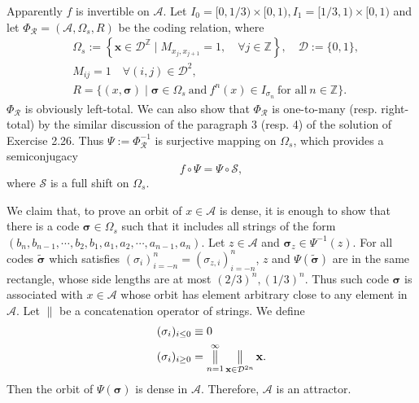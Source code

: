 \documentclass[a4paper,11pt,fleqn]{article}
\newcommand{\catop}{\mathop{\big \|}\limits}
\begin{document}
Apparently $f$ is invertible on $\mathcal{A}$. Let $I_0 = [0,1/3)\times [0,1), I_1 = [1/3,1)\times [0,1)$ and let $\Phi_{\mathcal R} =  (\mathcal{A},\Omega_s,R)$ be the coding relation, where
\begin{align}
&\Omega_s:=\left\{\mathbf{x} \in \mathcal{D}^{\mathbb{Z}} \mid M_{x_j, x_{j+1}}=1, \quad \forall j \in \mathbb{Z}\right\}, \quad \mathcal{D}:=\{0,1\}, \\
&M_{ij} = 1 \quad \forall (i,j) \in \mathcal{D}^2, \\
&R = \{(x,{\bm \sigma}) \mid {\bm \sigma} \in \Omega_s \ \text{and} \ f^n(x) \in I_{{\sigma}_n} \ \text{for all} \ n \in \mathbb{Z}\}.
\end{align}
$\Phi_{\mathcal R}$ is obviously left-total. We can also show that $\Phi_{\mathcal R}$ is one-to-many (resp. right-total) by the similar discussion of the paragraph 3 (resp. 4) of the solution of Exercise 2.26. Thus $\Psi:=\Phi_{\mathcal R}^{-1}$ is surjective mapping on $\Omega_s$, which provides a semiconjugacy  
\begin{equation}
    f\circ \Psi = \Psi\circ \mathcal{S}, 
\end{equation} 
where $\mathcal{S}$ is a full shift on $\Omega_s$. 

We claim that, to prove an orbit of $x \in \mathcal{A}$ is dense, it is enough to show that there is a code ${\bm \sigma} \in \Omega_s$ such that it includes all strings of the form $(b_n,b_{n-1},\cdots,b_2,b_1,a_1,a_2,\cdots,a_{n-1},a_n)$. Let $z\in\mathcal{A}$ and ${\bm \sigma}_z \in \Psi^{-1}(z)$. For all codes $\tilde{\bm \sigma}$ which satisfies $({\sigma_i})_{i=-n}^n = ({\sigma_{z,i}})_{i=-n}^n$, $z$ and $\Psi(\tilde{\bm \sigma})$ are in the same rectangle, whose side lengths are at most $(2/3)^n,(1/3)^n$. Thus such code ${\bm \sigma}$ is associated with $x \in \mathcal{A}$ whose orbit has element arbitrary close to any element in $\mathcal{A}$. 
Let $\|$ be a concatenation operator of strings. We define 
\begin{align}
    &(\sigma_i)_{i\le 0} \equiv 0 \\
    &(\sigma_i)_{i\ge 0} = \catop_{n=1}^\infty\catop_{{\bf x}\in \mathcal{D}^{2n}}{{\bf x}}.
\end{align}
Then the orbit of $\Psi({\bm \sigma})$ is dense in $\mathcal{A}$. Therefore, $\mathcal{A}$ is an attractor. 
\end{document}
